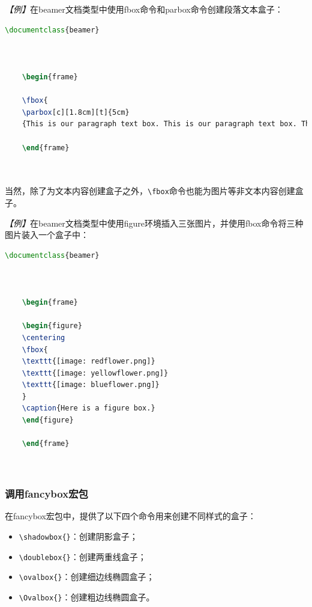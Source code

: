 \emph{【例】}在beamer文档类型中使用fbox命令和parbox命令创建段落文本盒子：
\begin{lstlisting}[language=TeX]
    \documentclass{beamer}

    

    \begin{frame}

    \fbox{
    \parbox[c][1.8cm][t]{5cm}
    {This is our paragraph text box. This is our paragraph text box. This is our paragraph text box. This is our paragraph text box.}}

    \end{frame}

    
\end{lstlisting}

当然，除了为文本内容创建盒子之外，\texttt{\textbackslash{}fbox}命令也能为图片等非文本内容创建盒子。

\emph{【例】}在beamer文档类型中使用figure环境插入三张图片，并使用fbox命令将三种图片装入一个盒子中：
\begin{lstlisting}[language=TeX]
    \documentclass{beamer}

    

    \begin{frame}

    \begin{figure}
    \centering
    \fbox{
    \texttt{[image: redflower.png]}
    \texttt{[image: yellowflower.png]}
    \texttt{[image: blueflower.png]}
    }
    \caption{Here is a figure box.}
    \end{figure}

    \end{frame}

    
\end{lstlisting}

\subsubsection{调用fancybox宏包}

在fancybox宏包中，提供了以下四个命令用来创建不同样式的盒子：
\begin{itemize}
    \item \texttt{\textbackslash{}shadowbox\{\}}：创建阴影盒子；
    \item \texttt{\textbackslash{}doublebox\{\}}：创建两重线盒子；
    \item \texttt{\textbackslash{}ovalbox\{\}}：创建细边线椭圆盒子；
    \item \texttt{\textbackslash{}Ovalbox\{\}}：创建粗边线椭圆盒子。
\end{itemize}

